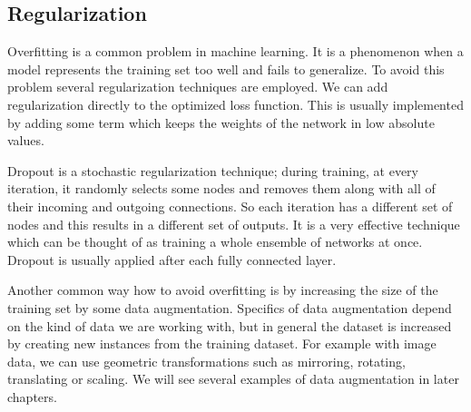 \subsection{Regularization}
Overfitting is a common problem in machine learning. It is a phenomenon when a model represents the training set too well and fails to generalize. To avoid this problem several regularization techniques are employed. We can add regularization directly to the optimized loss function. This is usually implemented by adding some term which keeps the weights of the network in low absolute values. \par
Dropout \cite{srivastava_dropout:_2014} is a stochastic regularization technique; during training, at every iteration, it randomly selects some nodes and removes them along with all of their incoming and outgoing connections. So each iteration has a different set of nodes and this results in a different set of outputs. It is a very effective technique which can be thought of as training a whole ensemble of networks at once. Dropout is usually applied after each fully connected layer. \par
Another common way how to avoid overfitting is by increasing the size of the training set by some data augmentation. Specifics of data augmentation depend on the kind of data we are working with, but in general the dataset is increased by creating new instances from the training dataset. For example with image data, we can use geometric transformations such as mirroring, rotating, translating or scaling. We will see several examples of data augmentation in later chapters.

